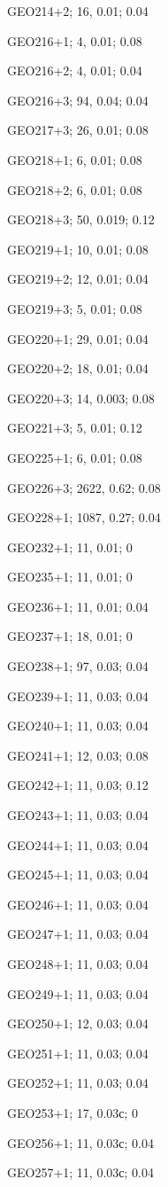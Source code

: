 GEO214+2; 16, 0.01; 0.04

GEO216+1; 4, 0.01; 0.08

GEO216+2; 4, 0.01; 0.04

GEO216+3; 94, 0.04; 0.04

GEO217+3; 26, 0.01; 0.08

GEO218+1; 6, 0.01; 0.08

GEO218+2; 6, 0.01; 0.08

GEO218+3; 50, 0.019; 0.12

GEO219+1; 10, 0.01; 0.08

GEO219+2; 12, 0.01; 0.04

GEO219+3; 5, 0.01; 0.08

GEO220+1; 29, 0.01; 0.04

GEO220+2; 18, 0.01; 0.04

GEO220+3; 14, 0.003; 0.08

GEO221+3; 5, 0.01; 0.12

GEO225+1; 6, 0.01; 0.08

GEO226+3; 2622, 0.62; 0.08

GEO228+1; 1087, 0.27; 0.04

GEO232+1; 11, 0.01; 0

GEO235+1; 11, 0.01; 0

GEO236+1; 11, 0.01; 0.04

GEO237+1; 18, 0.01; 0

GEO238+1; 97, 0.03; 0.04

GEO239+1; 11, 0.03; 0.04

GEO240+1; 11, 0.03; 0.04

GEO241+1; 12, 0.03; 0.08

GEO242+1; 11, 0.03; 0.12

GEO243+1; 11, 0.03; 0.04

GEO244+1; 11, 0.03; 0.04

GEO245+1; 11, 0.03; 0.04

GEO246+1; 11, 0.03; 0.04

GEO247+1; 11, 0.03; 0.04

GEO248+1; 11, 0.03; 0.04

GEO249+1; 11, 0.03; 0.04

GEO250+1; 12, 0.03; 0.04

GEO251+1; 11, 0.03; 0.04

GEO252+1; 11, 0.03; 0.04

GEO253+1; 17, 0.03с; 0

GEO256+1; 11, 0.03с; 0.04

GEO257+1; 11, 0.03с; 0.04


